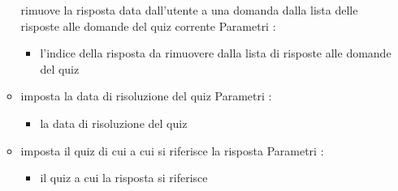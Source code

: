 \begin{itemize}
\begin{itemize}
rimuove la risposta data dall'utente a una domanda dalla lista delle risposte alle domande del quiz corrente
\newline
Parametri :
\begin{itemize}
\item {}
\newline
l'indice della risposta da rimuovere dalla lista di risposte alle domande del quiz
\end{itemize}
\item {}
\newline
imposta la data di risoluzione del quiz
\newline
Parametri :
\begin{itemize}
\item {}
\newline
la data di risoluzione del quiz
\end{itemize}
\item {}
\newline
imposta il quiz di cui a cui si riferisce la risposta
\newline
Parametri :
\begin{itemize}
\item {}
\newline
il quiz a cui la risposta si riferisce
\end{itemize}
\end{itemize}
\end{itemize}
